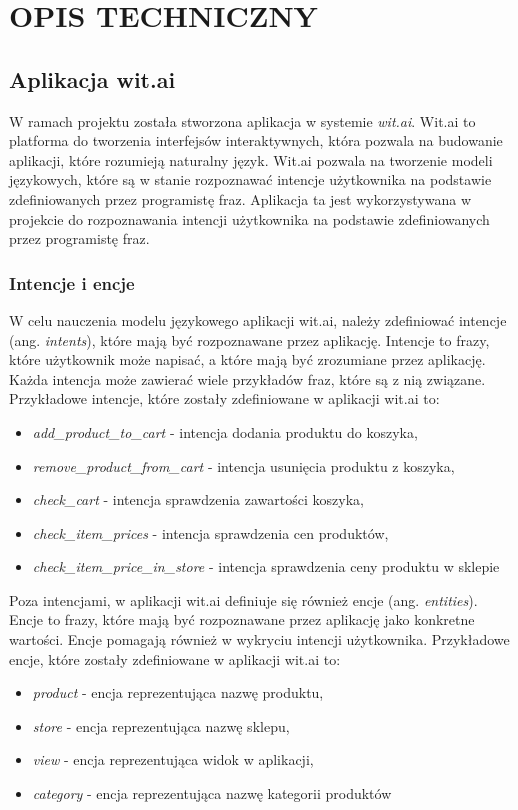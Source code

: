\chapter{OPIS TECHNICZNY}
\label{chapter:opis_techniczny}


\section{Aplikacja wit.ai}
W ramach projektu została stworzona aplikacja w systemie \textit{wit.ai}. Wit.ai to platforma do tworzenia interfejsów interaktywnych, która pozwala na budowanie aplikacji, które rozumieją naturalny język. Wit.ai pozwala na tworzenie modeli językowych, które są w stanie rozpoznawać intencje użytkownika na podstawie zdefiniowanych przez programistę fraz. Aplikacja ta jest wykorzystywana w projekcie do rozpoznawania intencji użytkownika na podstawie zdefiniowanych przez programistę fraz.

\subsection{Intencje i encje}

W celu nauczenia modelu językowego aplikacji wit.ai, należy zdefiniować intencje (ang. \textit{intents}), które mają być rozpoznawane przez aplikację. Intencje to frazy, które użytkownik może napisać, a które mają być zrozumiane przez aplikację. Każda intencja może zawierać wiele przykładów fraz, które są z nią związane. Przykładowe intencje, które zostały zdefiniowane w aplikacji wit.ai to:
\begin{itemize}
    \item \textit{add\_product\_to\_cart} - intencja dodania produktu do koszyka,
    \item \textit{remove\_product\_from\_cart} - intencja usunięcia produktu z koszyka,
    \item \textit{check\_cart} - intencja sprawdzenia zawartości koszyka,
    \item \textit{check\_item\_prices} - intencja sprawdzenia cen produktów,
    \item \textit{check\_item\_price\_in\_store} - intencja sprawdzenia ceny produktu w sklepie
\end{itemize}

Poza intencjami, w aplikacji wit.ai definiuje się również encje (ang. \textit{entities}). Encje to frazy, które mają być rozpoznawane przez aplikację jako konkretne wartości. Encje pomagają również w wykryciu intencji użytkownika. Przykładowe encje, które zostały zdefiniowane w aplikacji wit.ai to:
\begin{itemize}
    \item \textit{product} - encja reprezentująca nazwę produktu,
    \item \textit{store} - encja reprezentująca nazwę sklepu,
    \item \textit{view} - encja reprezentująca widok w aplikacji,
    \item \textit{category} - encja reprezentująca nazwę kategorii produktów
\end{itemize}

